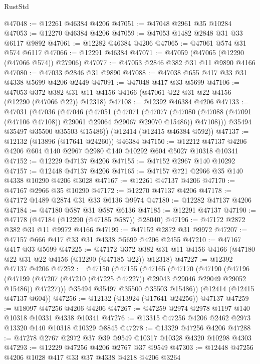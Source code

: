 \begin{lexlean}{RustStd}
\begin{coremodule}
{\begin{coremodule}
{{{{{{{{{{{{{{{{{{{{{{{{{{{{{{{{{{{{{{{{{{{{{{{{{{@47048 := @12261 @46384 @4206
@47051 := @47048 @2961 @35 @10284
@47053 := @12270 @46384 @4206
@47059 := @47053 @1482 @2848 @31 @33 @6117 @9892
@47061 := @12282 @46384 @4206
@47065 := @47061 @574 @31 @574 @6117
@47066 := @12291 @46384
@47071 := @47059 (@47065 (@12290 (@47066 @574)) @27906)
@47077 := @47053 @2846 @382 @31 @11 @9890 @4166
@47080 := @47033 @2846 @31 @9890
@47088 := @47038 @655 @417 @33 @31 @4338 @5699 @4206 @2449
@47091 := @47048 @417 @33 @5699
@47106 := @47053
    @372
    @382
    @31
    @11
    @4156
    @4166
    (@47061 @22 @31 @22 @4156 (@12290 (@47066 @22)) @12318)
@47108 := @12392 @46384 @4206
@47133 := @47031
    (@47036
      (@47046
        (@47051
          (@47071
            (@47077
              (@47080 (@47088 (@47091 (@47106 @47108)) @29061 @29064 @29067 @29070 @15486))
              @47108)))
        @35494
        @35497
        @35500
        @35503
        @15486))
    (@12414 (@12415 @46384 @592))
@47137 := @12132 (@13896 (@17641 @24260)) @46384
@47150 := @12212 @47137 @4206 @4206 @604 @140 @2967 @2980 @140 @10292 @604 @5027 @10318 @10341
@47152 := @12229 @47137 @4206
@47155 := @47152 @2967 @140 @10292
@47157 := @12448 @47137 @4206
@47165 := @47157 @721 @2966 @35 @140 @4338 @10290 @4206 @3028
@47167 := @12261 @47137 @4206
@47170 := @47167 @2966 @35 @10290
@47172 := @12270 @47137 @4206
@47178 := @47172 @1489 @2874 @31 @33 @6136 @9974
@47180 := @12282 @47137 @4206
@47184 := @47180 @587 @31 @587 @6136
@47185 := @12291 @47137
@47190 := @47178 (@47184 (@12290 (@47185 @587)) @28040)
@47196 := @47172 @2872 @382 @31 @11 @9972 @4166
@47199 := @47152 @2872 @31 @9972
@47207 := @47157 @666 @417 @33 @31 @4338 @5699 @4206 @2455
@47210 := @47167 @417 @33 @5699
@47225 := @47172
    @372
    @382
    @31
    @11
    @4156
    @4166
    (@47180 @22 @31 @22 @4156 (@12290 (@47185 @22)) @12318)
@47227 := @12392 @47137 @4206
@47252 := @47150
    (@47155
      (@47165
        (@47170
          (@47190
            (@47196
              (@47199 (@47207 (@47210 (@47225 @47227)) @29043 @29046 @29049 @29052 @15486))
              @47227)))
        @35494
        @35497
        @35500
        @35503
        @15486))
    (@12414 (@12415 @47137 @604))
@47256 := @12132 (@13924 (@17641 @24256)) @47137
@47259 := @18097 @47256 @4206 @4206
@47267 := @47259 @2974 @2978 @1197 @140 @10318 @10331 @4338 @10341
@47276 := @13315 @47256 @4206 @2462 @2973 @13320 @140 @10318 @10329 @8845
@47278 := @13329 @47256 @4206
@47288 := @47278 @2767 @2972 @37 @39 @9549 @10317 @10328 @4320 @10298 @4303
@47293 := @12229 @47256 @4206 @2767 @37 @9549
@47303 := @12448 @47256 @4206 @1028 @417 @33 @37 @4338 @4218 @4206 @3264
}}}}}}}}}}}}}}}}}}}}}}}}}}}}}}}}}}}}}}}}}}}}}}}}}}
\end{coremodule}}
\end{coremodule}
\end{lexlean}

